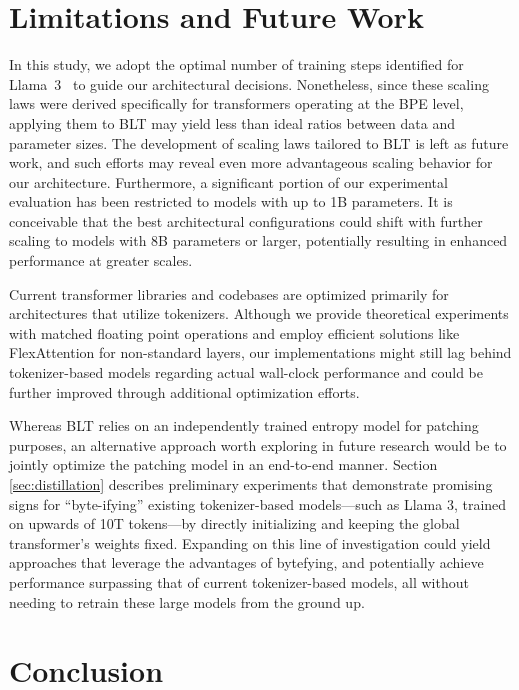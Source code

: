 \section{Limitations and Future Work}

In this study, we adopt the optimal number of training steps identified for Llama~3~\citep{dubey2024llama} to guide our architectural decisions. Nonetheless, since these scaling laws were derived specifically for transformers operating at the BPE level, applying them to {\textsc BLT} may yield less than ideal ratios between data and parameter sizes. The development of scaling laws tailored to {\textsc BLT} is left as future work, and such efforts may reveal even more advantageous scaling behavior for our architecture. Furthermore, a significant portion of our experimental evaluation has been restricted to models with up to 1B parameters. It is conceivable that the best architectural configurations could shift with further scaling to models with 8B parameters or larger, potentially resulting in enhanced performance at greater scales.

Current transformer libraries and codebases are optimized primarily for architectures that utilize tokenizers. Although we provide theoretical experiments with matched floating point operations and employ efficient solutions like FlexAttention for non-standard layers, our implementations might still lag behind tokenizer-based models regarding actual wall-clock performance and could be further improved through additional optimization efforts.

Whereas {\textsc BLT} relies on an independently trained entropy model for patching purposes, an alternative approach worth exploring in future research would be to jointly optimize the patching model in an end-to-end manner. Section \ref{sec:distillation} describes preliminary experiments that demonstrate promising signs for ``byte-ifying'' existing tokenizer-based models—such as Llama 3, trained on upwards of 10T tokens—by directly initializing and keeping the global transformer’s weights fixed. Expanding on this line of investigation could yield approaches that leverage the advantages of bytefying, and potentially achieve performance surpassing that of current tokenizer-based models, all without needing to retrain these large models from the ground up.

\section{Conclusion}
\label{section:conclusion}

